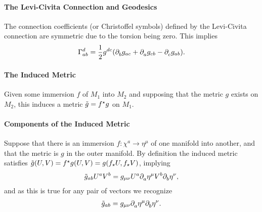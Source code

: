 \paragraph{The Levi-Civita Connection and Geodesics}
The connection coefficients (or Christoffel symbols) defined by the Levi-Civita connection are symmetric due to the torsion being zero. This implies
\begin{align*}
	\chris{d}{a}{b} = \frac{1}{2}g^{dc}(\del{b}{g_{ac}} + \del{a}{g_{cb}} - \del{c}{g_{ab}}).
\end{align*}

\paragraph{The Induced Metric}
Given some immersion $f$ of $M_{1}$ into $M_{2}$ and supposing that the metric $g$ exists on $M_{2}$, this induces a metric $\tilde{g} = f^{\star}g$ on $M_{1}$.

\paragraph{Components of the Induced Metric}
Suppose that there is an immersion $f: \chi^{a}\to\eta^{\mu}$ of one manifold into another, and that the metric is $g$ in the outer manifold. By definition the induced metric satisfies $\tilde{g}(U, V) = f^{\star}g(U, V) = g(f_{\star}U, f_{\star}V)$, implying
\begin{align*}
	\tilde{g}_{ab}U^{a}V^{b} = g_{\mu\nu}U^{a}\partial^{}_{a}\eta^{\mu}V^{b}\partial^{}_{b}\eta^{\nu},
\end{align*}
and as this is true for any pair of vectors we recognize
\begin{align*}
	\tilde{g}_{ab} = g_{\mu\nu}\partial^{}_{a}\eta^{\mu}\partial^{}_{b}\eta^{\nu}.
\end{align*}

